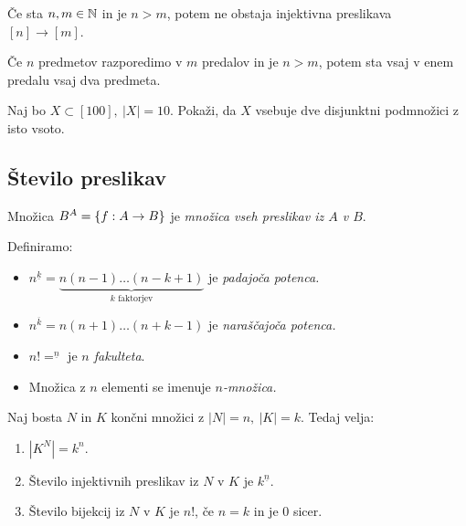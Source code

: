 \begin{trditev}
    Če sta $n, m \in \mathbb{N}$ in je $n > m$, potem ne obstaja injektivna preslikava $[n] \to [m]$.
\end{trditev}

\begin{opomba}
    Če $n$ predmetov razporedimo v $m$ predalov in je $n > m$, potem sta vsaj v enem predalu vsaj dva predmeta.
\end{opomba}

\begin{primer}
    Naj bo $X \subset [100], \ |X|=10$. Pokaži, da $X$ vsebuje dve disjunktni podmnožici z isto vsoto.
\end{primer}

\subsection{Število preslikav}
\begin{definicija}
    Množica $B^A = \left\{f: A \to B\right\}$ je \emph{množica vseh preslikav iz $A$ v $B$}.
\end{definicija}

\begin{definicija} Definiramo:
    \begin{itemize}
        \item $n^{\underline{k}} = \underbrace{n(n-1) \ldots (n-k+1)}_\text{$k$ faktorjev}$ je \emph{padajoča potenca.}
        \item $n^{\overline{k}} = n(n+1) \ldots (n+k-1)$ je \emph{naraščajoča potenca.}
        \item $n! = ^{\underline{n}}$ je \emph{$n$ fakulteta}.
        \item Množica z $n$ elementi se imenuje \emph{$n$-množica.}
    \end{itemize}
\end{definicija}

\begin{trditev}
    Naj bosta $N$ in $K$ končni množici z $|N| = n, \ |K| = k$. Tedaj velja:
    \begin{enumerate}
        \item $|K^N| = k^n$.
        \item Število injektivnih preslikav iz $N$ v $K$ je $k^{\underline{n}}$.
        \item Število bijekcij iz $N$ v $K$ je $n!$, če $n = k$ in je $0$ sicer.
    \end{enumerate} 
\end{trditev}


